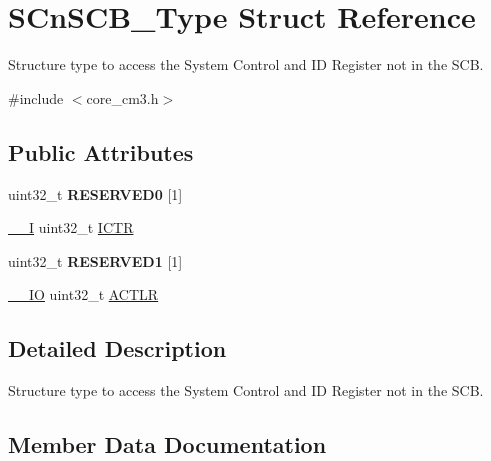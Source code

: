\hypertarget{structSCnSCB__Type}{}\section{S\+Cn\+S\+C\+B\+\_\+\+Type Struct Reference}
\label{structSCnSCB__Type}


Structure type to access the System Control and ID Register not in the S\+CB.  




{\ttfamily \#include $<$core\+\_\+cm3.\+h$>$}

\subsection*{Public Attributes}
\begin{DoxyCompactItemize}
\item 
uint32\+\_\+t {\bfseries R\+E\+S\+E\+R\+V\+E\+D0} \mbox{[}1\mbox{]}\hypertarget{structSCnSCB__Type_a9c1cf408b90b40c62f396da41416290f}{}\label{structSCnSCB__Type_a9c1cf408b90b40c62f396da41416290f}

\item 
\hyperlink{core__sc300_8h_af63697ed9952cc71e1225efe205f6cd3}{\+\_\+\+\_\+I} uint32\+\_\+t \hyperlink{structSCnSCB__Type_ad99a25f5d4c163d9005ca607c24f6a98}{I\+C\+TR}
\item 
uint32\+\_\+t {\bfseries R\+E\+S\+E\+R\+V\+E\+D1} \mbox{[}1\mbox{]}\hypertarget{structSCnSCB__Type_aa4e25c7691de11dd20a02d4732111496}{}\label{structSCnSCB__Type_aa4e25c7691de11dd20a02d4732111496}

\item 
\hyperlink{core__sc300_8h_aec43007d9998a0a0e01faede4133d6be}{\+\_\+\+\_\+\+IO} uint32\+\_\+t \hyperlink{structSCnSCB__Type_aacadedade30422fed705e8dfc8e6cd8d}{A\+C\+T\+LR}
\end{DoxyCompactItemize}


\subsection{Detailed Description}
Structure type to access the System Control and ID Register not in the S\+CB. 

\subsection{Member Data Documentation}
